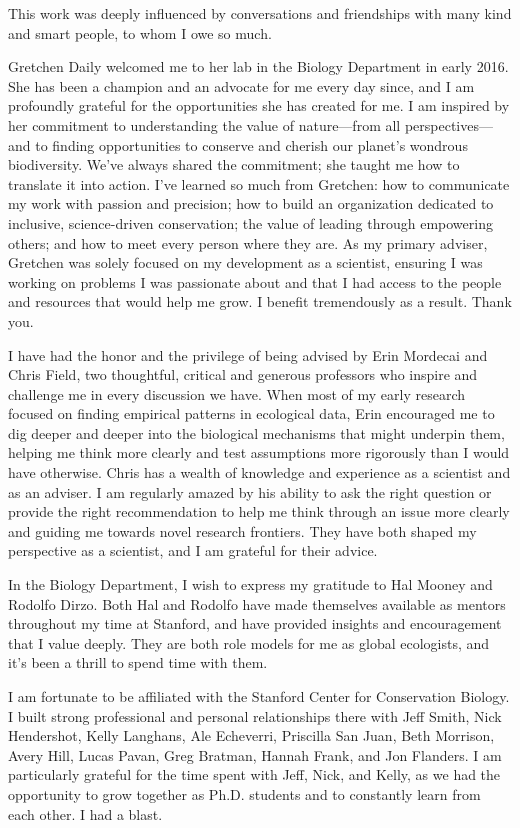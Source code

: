 
This work was deeply influenced by conversations and friendships with many kind and smart people, to whom I owe so much.

Gretchen Daily welcomed me to her lab in the Biology Department in early 2016. She has been a champion and an advocate for me every day since, and I am profoundly grateful for the opportunities she has created for me. I am inspired by her commitment to understanding the value of nature—from all perspectives—and to finding opportunities to conserve and cherish our planet's wondrous biodiversity. We've always shared the commitment; she taught me how to translate it into action. I've learned so much from Gretchen: how to communicate my work with passion and precision; how to build an organization dedicated to inclusive, science-driven conservation; the value of leading through empowering others; and how to meet every person where they are. As my primary adviser, Gretchen was solely focused on my development as a scientist, ensuring I was working on problems I was passionate about and that I had access to the people and resources that would help me grow. I benefit tremendously as a result. Thank you.

I have had the honor and the privilege of being advised by Erin Mordecai and Chris Field, two thoughtful, critical and generous professors who inspire and challenge me in every discussion we have. When most of my early research focused on finding empirical patterns in ecological data, Erin encouraged me to dig deeper and deeper into the biological mechanisms that might underpin them, helping me think more clearly and test assumptions more rigorously than I would have otherwise. Chris has a wealth of knowledge and experience as a scientist and as an adviser. I am regularly amazed by his ability to ask the right question or provide the right recommendation to help me think through an issue more clearly and guiding me towards novel research frontiers. They have both shaped my perspective as a scientist, and I am grateful for their advice.

In the Biology Department, I wish to express my gratitude to Hal Mooney and Rodolfo Dirzo. Both Hal and Rodolfo have made themselves available as mentors throughout my time at Stanford, and have provided insights and encouragement that I value deeply. They are both role models for me as global ecologists, and it's been a thrill to spend time with them.

I am fortunate to be affiliated with the Stanford Center for Conservation Biology. I built strong professional and personal relationships there with Jeff Smith, Nick Hendershot, Kelly Langhans, Ale Echeverri, Priscilla San Juan, Beth Morrison, Avery Hill, Lucas Pavan, Greg Bratman, Hannah Frank, and Jon Flanders. I am particularly grateful for the time spent with Jeff, Nick, and Kelly, as we had the opportunity to grow together as Ph.D. students and to constantly learn from each other. I had a blast.

